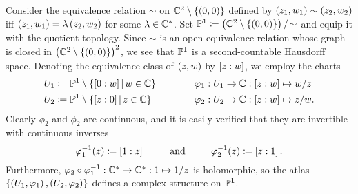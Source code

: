 \documentclass[../Moduli_Spaces_of_Riemann_Surfaces.tex]{subfiles}
\begin{document}
    \begin{example}\label{1.1:complex_projective_line}
        Consider the equivalence relation $\sim$ on $\C^2\comp\l\{\tpl{0,0}\r\}$ defined by $\tpl{z_1,w_1}\sim\tpl{z_2,w_2}$ iff $\tpl{z_1,w_1}=\lambda\tpl{z_2,w_2}$ for some $\lambda\in\C^\ast$. Set $\P^1\coloneqq\l(\C^2\comp\l\{\tpl{0,0}\r\}\r)/\!\sim$ and equip it with the quotient topology. Since $\sim$ is an open equivalence relation whose graph is closed in $\l(\C^2\comp\l\{\tpl{0,0}\r\}\r)^2$, we see that $\P^1$ is a second-countable Hausdorff space. Denoting the equivalence class of $\tpl{z,w}$ by $\proje{z:w}$, we employ the charts
        \begin{equation*}
            \begin{alignedat}{2}
                U_1&\coloneqq\P^1\comp\l\{\proje{0:w}\mid w\in\C\r\}\ \ \ \ \ \ \ \ \ \ \ \ &&\phi_1:U_1\to\C:\proje{z:w}\mapsto w/z \\
                U_2&\coloneqq\P^1\comp\l\{\proje{z:0}\mid z\in\C\r\}&&\phi_2:U_2\to\C:\proje{z:w}\mapsto z/w.
            \end{alignedat}
        \end{equation*}
        Clearly $\phi_2$ and $\phi_2$ are continuous, and it is easily verified that they are invertible with continuous inverses
        \begin{equation*}
            \phi_1^{-1}\!\l(z\r)\coloneqq\proje{1:z}\ \ \ \ \ \ \ \ \textrm{and}\ \ \ \ \ \ \ \ \phi_2^{-1}\!\l(z\r)\coloneqq\proje{z:1}.
        \end{equation*}
        Furthermore, $\phi_2\circ\phi_1^{-1}:\C^\ast\to\C^\ast:1\mapsto1/z$ is holomorphic, so the atlas $\l\{\tpl{U_1,\phi_1},\tpl{U_2,\phi_2}\r\}$ defines a complex structure on $\P^1$.\exqed
    \end{example}
\end{document}
